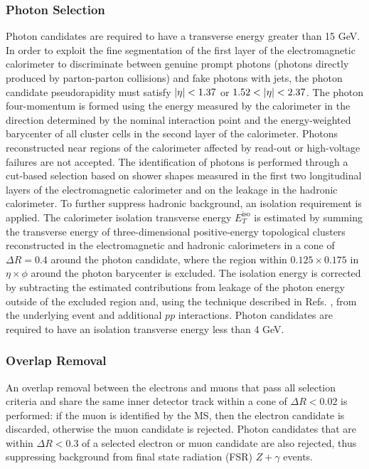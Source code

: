 \subsubsection*{Photon Selection}
Photon candidates are required to have a transverse energy greater than 15 GeV.
In order to exploit the fine segmentation of the first layer of the electromagnetic
calorimeter to discriminate between genuine prompt photons (photons directly produced
by parton-parton collisions) and fake photons with jets, the photon candidate 
pseudorapidity must satisfy $\abseta < 1.37$ or $1.52 < \abseta < 2.37$. The
photon four-momentum is formed using the energy measured by the calorimeter in the
direction determined by the nominal interaction point and the energy-weighted
barycenter of all cluster cells in the second layer of the calorimeter. Photons
reconstructed near regions of the calorimeter affected by read-out or high-voltage 
failures are not accepted. The identification of photons is performed through a
cut-based selection based on shower shapes measured in the first two longitudinal
layers of the electromagnetic calorimeter and on the leakage in the hadronic
calorimeter. To further suppress hadronic background, an isolation requirement is 
applied. The calorimeter isolation transverse energy $E_{T}^{\text{iso}}$ is
estimated by summing the transverse energy of three-dimensional positive-energy
topological clusters reconstructed in the electromagnetic and hadronic 
calorimeters in a cone of $\Delta R = 0.4$ around the photon candidate,
where the region within $0.125 \times 0.175$ in $\eta \times \phi$ around the
photon barycenter is excluded. The isolation energy is corrected by subtracting
the estimated contributions from leakage of the photon energy outside of the
excluded region and, using the technique described in 
Refs. \cite{Cacciari:2008gn, Cacciari:2009dp},
from the underlying event and additional $pp$ interactions. Photon candidates
are required to have an isolation transverse energy less than 4 GeV.

\subsubsection*{Overlap Removal}
An overlap removal between the electrons and muons that pass all selection
criteria and share the same inner detector track within a cone of $\Delta R < 0.02$
is performed: if the muon is identified by the MS, then the electron candidate is 
discarded, otherwise the muon candidate is rejected. Photon candidates that are
within $\Delta R < 0.3$ of a selected electron or muon candidate are also rejected,
thus suppressing background from final state radiation (FSR) $Z+\gamma$ events.

